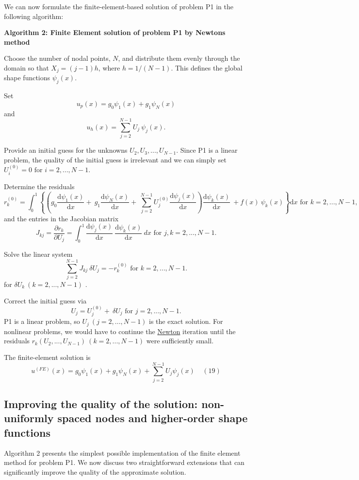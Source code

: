We can now formulate the finite-\/element-\/based solution of problem P1 in the following algorithm\+: \begin{center} {\bfseries  Algorithm 2\+: Finite Element solution of problem P1 by Newton\textquotesingle{}s method} \end{center} 
\begin{DoxyItemize}
\item Choose the number of nodal points, $ N $, and distribute them evenly through the domain so that $ X_j=(j-1)h$, where $h=1/(N-1)$. This defines the global shape functions $ \psi_j(x)$.
\item Set \[ u_p(x) = g_0 \psi_1(x) + g_1 \psi_N(x) \] and \[ u_h(x) = \sum_{j=2}^{N-1} U_{j}\ \psi_j(x). \]
\item Provide an initial guess for the unknowns $ U_2,U_3,...,U_{N-1}$. Since P1 is a linear problem, the quality of the initial guess is irrelevant and we can simply set $ U_i^{(0)}=0 \mbox{\ \ \ for $i=2,...,N-1$}. $
\item Determine the residuals \[ r_k^{(0)} = \int_0^1 \left\{ \left( g_0 \frac{\mbox{d} \psi_1(x)}{\mbox{d} x} + \ g_1 \frac{\mbox{d} \psi_N(x)}{\mbox{d} x} + \ \sum_{j=2}^{N-1} U_{j}^{(0)}\frac{\mbox{d} \psi_j(x)}{\mbox{d} x} \right) \frac{\mbox{d} \psi_k(x)}{\mbox{d} x}\ + f(x) \ \psi_k(x) \right\} \mbox{d}x \mbox{\ \ \ \ \ \ for $k=2,...,N-1,$} \] and the entries in the Jacobian matrix \[ J_{kj} = \frac{\partial r_k}{\partial U_j} = \int_0^1 \frac{\mbox{d} \psi_j(x)}{\mbox{d} x} \ \frac{\mbox{d} \psi_k(x)}{\mbox{d} x} \ dx \mbox{\ \ \ for $j,k=2,...,N-1.$} \]
\item Solve the linear system \[ \sum_{j=2}^{N-1} J_{kj} \ \delta U_j = - r_k^{(0)} \mbox{\ \ \ for $k=2,...,N-1.$} \] for $ \delta U_k \ (k=2,...,N-1) $ .
\item Correct the initial guess via \[ U_j = U_j^{(0)} + \ \delta U_j \mbox{\ \ \ for $j=2,...,N-1.$} \] P1 is a linear problem, so $ U_j \ (j=2,...,N-1) $ is the exact solution. For nonlinear problems, we would have to continue the \hyperlink{index_Newton}{Newton} iteration until the residuals $ r_k(U_2,...,U_{N-1}) \ (k=2,...,N-1) $ were sufficiently small.
\item The finite-\/element solution is \[ u^{(FE)}(x) = g_0 \psi_1(x)+ g_1 \psi_N(x) + \sum_{j=2}^{N-1} U_j \psi_j(x) \ \ \ \ \ (19) \]
\end{DoxyItemize}

\hypertarget{index_non_uniform}{}\subsection{Improving the quality of the solution\+: non-\/uniformly spaced nodes and higher-\/order shape functions}\label{index_non_uniform}
Algorithm 2 presents the simplest possible implementation of the finite element method for problem P1. We now discuss two straightforward extensions that can significantly improve the quality of the approximate solution.

